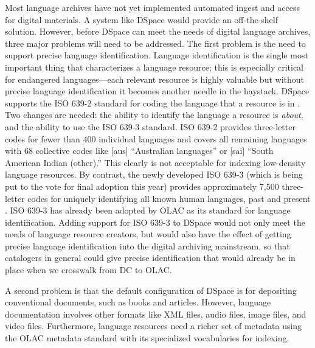 
Most language archives have not yet implemented automated ingest and
access for digital materials.  A system like DSpace would provide 
an off-the-shelf solution.  
However, before DSpace can meet the needs of digital language archives,
three major problems will need to be addressed.
The first problem is the need to support precise language identification.
Language identification is the single most important thing that
characterizes a language resource; this is especially critical for
endangered languages---each relevant resource is highly valuable but
without precise language identification it becomes another needle in
the haystack. DSpace supports the ISO 639-2 standard for coding the
language that a resource is in \citep{ISO639-2}. Two changes are needed:
the ability to identify the language a resource is \emph{about}, and
the ability to use the ISO 639-3 standard.  ISO 639-2 provides
three-letter codes for fewer than 400 individual languages and covers all
remaining languages with 68 collective codes like [aus] ``Australian 
languages'' or [sai] ``South American Indian (other).''  This clearly
is not acceptable for indexing low-density language resources.
By contrast, the newly developed ISO 639-3 (which is being put to
the vote for final adoption this year) provides approximately 7,500 
three-letter codes for uniquely identifying all known human languages,
past and present \citep{ISO639-3}.  ISO 639-3 has already been adopted by OLAC as its
standard for language identification.
Adding support for ISO 639-3 to DSpace would not only meet the
needs of language resource creators, but would also have the
effect of getting precise language identification into the 
digital archiving mainstream, so that catalogers in general could
give precise identification that would already be in place
when we crosswalk from DC to OLAC.


A second problem is that the default configuration of DSpace
is for depositing conventional documents, such as books and articles.
However, language documentation involves other formats like
XML files, audio files, image files, and video files. Furthermore,
language resources need a richer set of metadata using the OLAC 
metadata standard with its specialized vocabularies for indexing.

